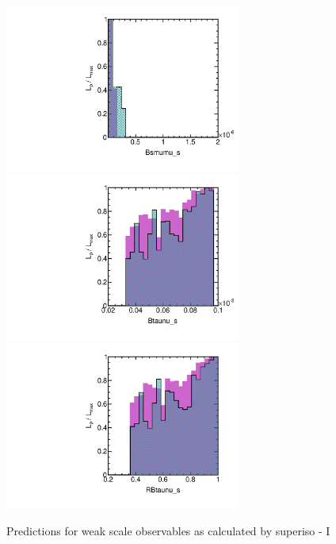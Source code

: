 \begin{figure}[htbp]
\begin{center}
\includegraphics[height=5.5cm]{figs/fig_Bsmumu_s.pdf} \\
\includegraphics[height=5.5cm]{figs/fig_Btaunu_s.pdf} 
\includegraphics[height=5.5cm]{figs/fig_RBtaunu_s.pdf} 
\caption{Predictions for weak scale observables as calculated by superiso - I}
\label{default}
\end{center}
\end{figure}


